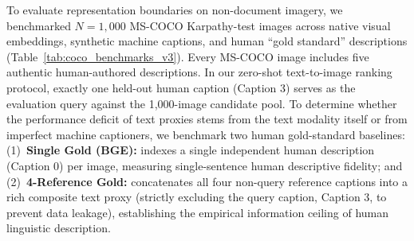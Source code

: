 To evaluate representation boundaries on non-document imagery, we benchmarked $N=1{,}000$ MS-COCO Karpathy-test images \cite{karpathy2015deep, lin2014coco} across native visual embeddings, synthetic machine captions, and human ``gold standard'' descriptions (Table~\ref{tab:coco_benchmarks_v3}). Every MS-COCO image includes five authentic human-authored descriptions. In our zero-shot text-to-image ranking protocol, exactly one held-out human caption (Caption 3) serves as the evaluation query against the 1,000-image candidate pool. To determine whether the performance deficit of text proxies stems from the text modality itself or from imperfect machine captioners, we benchmark two human gold-standard baselines: (1)~\textbf{Single Gold (BGE):} indexes a single independent human description (Caption 0) per image, measuring single-sentence human descriptive fidelity; and (2)~\textbf{4-Reference Gold:} concatenates all four non-query reference captions into a rich composite text proxy (strictly excluding the query caption, Caption 3, to prevent data leakage), establishing the empirical information ceiling of human linguistic description.

